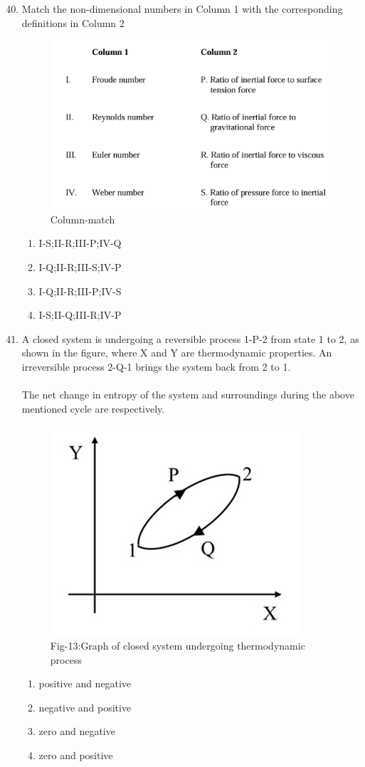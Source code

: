 \documentclass[journal]{IEEEtran}
\theoremstyle{remark}
\begin{document}
\begin{enumerate}[itemsep=1em]
\setcounter{enumi}{39}
\item Match the non-dimensional numbers in Column 1 with the corresponding definitions in Column 2 
\begin{figure}[H]
    \centering
    \includegraphics[width=0.6\columnwidth]{figs/fig-12.jpeg}
    \caption*{Column-match}
    \label{fig:12}
\end{figure}
\begin{enumerate}[leftmargin=2.5em, labelsep=0.5em, itemsep=0.5em]
    \item I-S;II-R;III-P;IV-Q
    \item I-Q;II-R;III-S;IV-P
    \item I-Q;II-R;III-P;IV-S
    \item I-S;II-Q;III-R;IV-P
\end{enumerate}
\end{enumerate}

\begin{enumerate}[itemsep=1em]
\setcounter{enumi}{40}
\item A closed system is undergoing a reversible process 1-P-2 from state 1 to 2, as shown in the figure, where X and Y are thermodynamic properties. An irreversible process 2-Q-1 brings the system back from 2 to 1. \\
\\
The net change in entropy of the system and surroundings during the above mentioned cycle are \underline{\hspace{2cm}} respectively.
\begin{figure}[H]
    \centering
    \includegraphics[width=0.4\columnwidth]{figs/fig-13.jpeg}
    \caption*{Fig-13:Graph of closed system undergoing thermodynamic process}
    \label{fig:13}
\end{figure}
\begin{enumerate}[leftmargin=2.5em, labelsep=0.5em, itemsep=0.5em]
    \item positive and negative
    \item negative and positive
    \item zero and negative
    \item zero and positive
\end{enumerate}
\end{enumerate}
\end{document}
